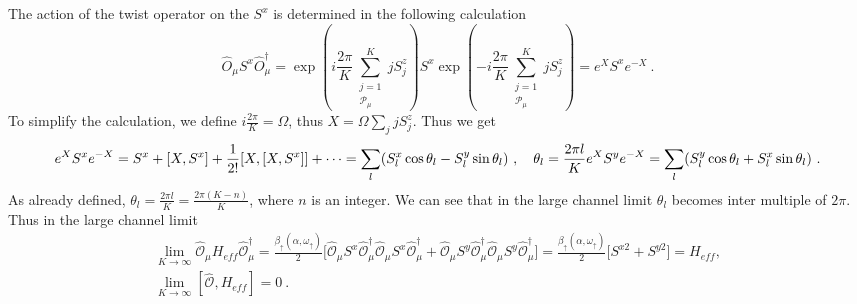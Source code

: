 \documentclass[reprint,onecolumn,prb,superscriptaddress]{revtex4-2}
\begin{document}
The action of the twist operator on the $S^x$ is determined in the following calculation
\begin{equation}
\hat{O}_{\mu} S^x \hat{O}^{\dagger}_{\mu} = \exp({i\frac{2\pi}{K} \displaystyle\sum_{\substack{j=1\\ \mathcal{P}_{\mu}}}^{K} j S_j^z} )S^x \exp({-i\frac{2\pi}{K} \displaystyle\sum_{\substack{j=1\\ \mathcal{P}_{\mu}}}^{K} j S_j^z} ) = e^{X} S^x e^{-X}~.
\end{equation}
To simplify the calculation, we define $i\frac{2\pi}{K}=\Omega$, thus $X=\Omega\sum_j jS^z_j$. Thus we get
\begin{equation}
e^X S^x e^{-X}= S^x+[X,S^x] + \frac{1}{2!}[X,[X,S^x]] +\cdots = \sum_l ( S^x_l \cos \theta_l -  S_l^y \sin \theta_l ) ~,~~~\theta_l=\frac{2\pi l}{K}\\
e^X S^y e^{-X}= \sum_l  (S^y_l \cos\theta_l  + S^x_l \sin\theta_l)~.
\end{equation}
As already defined, $\theta_l=\frac{2\pi l}{K}=\frac{2\pi (K-n)}{K}$, where $n$ is an integer. We can see that in the large channel limit $\theta_l $ becomes inter multiple of $2\pi$. Thus in the large channel limit
\begin{gather}
 \lim_{K\rightarrow \infty}\hat{\mathcal{O}}_{\mu} H_{eff} \hat{\mathcal{O}}_{\mu}^{\dagger}\nonumber = \frac{\beta_{\uparrow}(\alpha,\omega_{\uparrow})}{2} \bigg[ \hat{\mathcal{O}}_{\mu} S^x \hat{\mathcal{O}}_{\mu}^{\dagger} \hat{\mathcal{O}}_{\mu} S^x \hat{\mathcal{O}}_{\mu}^{\dagger}  + \hat{\mathcal{O}}_{\mu} S^y \hat{\mathcal{O}}_{\mu}^{\dagger} \hat{\mathcal{O}}_{\mu} S^y \hat{\mathcal{O}}_{\mu}^{\dagger}  \bigg] = \frac{\beta_{\uparrow}(\alpha,\omega_{\uparrow})}{2} \bigg[  S^{x2}+S^{y2}  \bigg] = H_{eff},\\
 \lim_{K\rightarrow \infty } [\hat{\mathcal{O}},H_{eff}] = 0~.
\label{eq:hamiltonian_twisted}
\end{gather}
 
\end{document}
